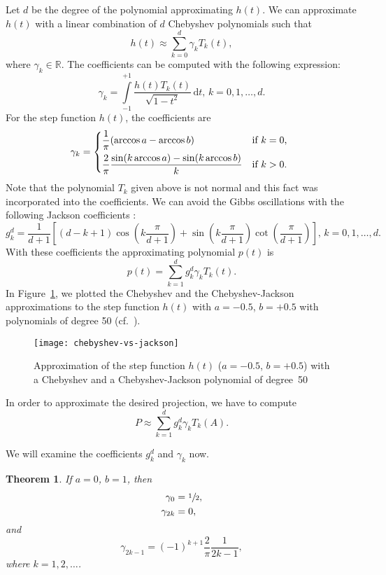 \documentclass[%
	paper=a4,
	fontsize=10pt,
	DIV11,BCOR10mm,
	numbers=noenddot,
	abstract=yes
]{scrartcl}
\newcommand{\R}{\mathbb{R}}
\newtheorem{theorem}{Theorem}[section]
\theoremstyle{definition}
\begin{document}
Let $d$ be the degree of the polynomial approximating $h(t)$. We can approximate
$h(t)$ with a linear combination of $d$ Chebyshev polynomials such that
\[ h(t) \approx \sum_{k=0}^d \gamma_k T_k(t), \]
where $\gamma_k \in \R$. The coefficients can be computed with the following
expression:
\[
	\gamma_k =
	\int\limits_{-1}^{+1} \frac{h(t) T_k(t)}{\sqrt{1 - t^2}}\,\mathrm{d}t,
	\, k = 0, 1, \dotsc, d.
\]
For the step function $h(t)$, the coefficients are \cite{DiNapoli2016}
\[
	\gamma_k =
	\begin{dcases*}
		\frac{1}{\pi} (\arccos a  - \arccos b) & if $k = 0$, \\
		\frac{2}{\pi} \frac{\sin(k \arccos a) - \sin(k \arccos b)}{k} &
			if $k > 0$.
	\end{dcases*}
\]
Note that the polynomial $T_k$ given above is not normal and this fact was
incorporated into the coefficients. We can avoid the Gibbs oscillations with the
following Jackson coefficients \cite[§II.C.3]{Weisse2006}:
\begin{equation}
\label{eq:jackson-coefficients}
	g_k^d =
	\frac{1}{d+1}
	\left[
		(d - k + 1) \cos\left(k \frac{\pi}{d+1}\right) +
		\sin\left(k \frac{\pi}{d+1}\right) \cot\left(\frac{\pi}{d+1}\right)
	\right], \, k = 0, 1, \dotsc, d.
\end{equation}
With these coefficients the approximating polynomial $p(t)$ is
\[ p(t) = \sum_{k=1}^d g_k^d \gamma_k T_k(t). \]
In Figure~\ref{fig:chebyshev-vs-jackson}, we plotted the Chebyshev and the
Chebyshev-Jackson approximations to the step function $h(t)$ with $a = -0.5$, $b
= +0.5$ with polynomials of degree 50 (cf.~\cite[Fig.~1]{DiNapoli2016}).

\begin{figure}
	\begin{center}
		\texttt{[image: chebyshev-vs-jackson]}
	\end{center}
	\caption{Approximation of the step function $h(t)$ ($a = -0.5$, $b =
		+0.5$) with a Chebyshev and a Chebyshev-Jackson polynomial of
	degree~50}
	\label{fig:chebyshev-vs-jackson}
\end{figure}

In order to approximate the desired projection, we have to compute
\[ P \approx \sum_{k=1}^d g_k^d \gamma_k T_k(A). \]

We will examine the coefficients $g_k^d$ and $\gamma_k$ now.

\begin{theorem}
	\label{thm:chebyshev-heaviside-coefficients}
	If $a = 0$, $b = 1$, then
	\begin{align*}
		\gamma_0 &= \sfrac{1}{2}, \\
		\gamma_{2k} &= 0,
	\end{align*}
	and
	\[
		\gamma_{2k-1} = (-1)^{k+1} \frac{2}{\pi} \frac{1}{2k - 1},
	\]
	where $k = 1, 2, \dotso$.
\end{theorem}
\end{document}
